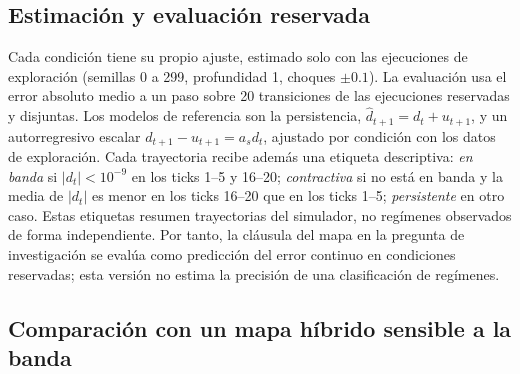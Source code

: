 \subsection{Estimación y evaluación reservada}

Cada condición tiene su propio ajuste, estimado solo con las ejecuciones de exploración (semillas 0 a 299, profundidad 1, choques $\pm0.1$). La evaluación usa el error absoluto medio a un paso sobre 20 transiciones de las ejecuciones reservadas y disjuntas. Los modelos de referencia son la persistencia, $\hat d_{t+1}=d_t+u_{t+1}$, y un autorregresivo escalar $d_{t+1}-u_{t+1}=a_s d_t$, ajustado por condición con los datos de exploración. Cada trayectoria recibe además una etiqueta descriptiva: \emph{en banda} si $|d_t|<10^{-9}$ en los ticks 1--5 y 16--20; \emph{contractiva} si no está en banda y la media de $|d_t|$ es menor en los ticks 16--20 que en los ticks 1--5; \emph{persistente} en otro caso. Estas etiquetas resumen trayectorias del simulador, no regímenes observados de forma independiente. Por tanto, la cláusula del mapa en la pregunta de investigación se evalúa como predicción del error continuo en condiciones reservadas; esta versión no estima la precisión de una clasificación de regímenes.

\subsection{Comparación con un mapa híbrido sensible a la banda}
\label{sec:hybrid-method}

